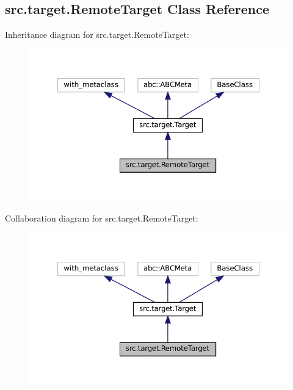 \hypertarget{classsrc_1_1target_1_1RemoteTarget}{}\subsection{src.\+target.\+Remote\+Target Class Reference}
\label{classsrc_1_1target_1_1RemoteTarget}


Inheritance diagram for src.\+target.\+Remote\+Target\+:
\nopagebreak
\begin{figure}[H]
\begin{center}
\leavevmode
\includegraphics[width=350pt]{classsrc_1_1target_1_1RemoteTarget__inherit__graph}
\end{center}
\end{figure}


Collaboration diagram for src.\+target.\+Remote\+Target\+:
\nopagebreak
\begin{figure}[H]
\begin{center}
\leavevmode
\includegraphics[width=350pt]{classsrc_1_1target_1_1RemoteTarget__coll__graph}
\end{center}
\end{figure}

